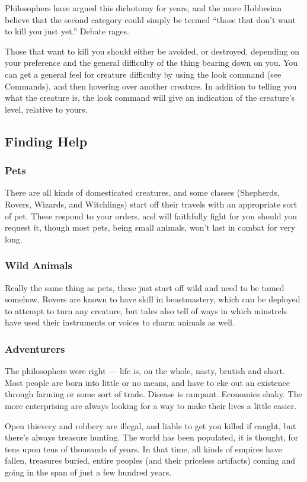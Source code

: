 Philosophers have argued this dichotomy for years, and the more Hobbesian
believe that the second category could simply be termed ``those that don't
want to kill you just yet.''  Debate rages.

Those that want to kill you should either be avoided, or destroyed,
depending on your preference and the general difficulty of the thing
bearing down on you.  You can get a general feel for creature difficulty
by using the look command (see Commands), and then hovering over another 
creature.  In addition to telling you what the creature is, the look 
command will give an indication of the creature's level, relative to yours.

\subsection{Finding Help}
\subsubsection{Pets}
There are all kinds of domesticated creatures, and some classes (Shepherds,
Rovers, Wizards, and Witchlings) start off their travels with an appropriate
sort of pet.  These respond to your orders, and will faithfully fight for
you should you request it, though most pets, being small animals, won't last
in combat for very long.

\subsubsection{Wild Animals}
Really the same thing as pets, these just start off wild and need to be
tamed somehow.  Rovers are known to have skill in beastmastery, which can be
deployed to attempt to turn any creature, but tales also tell of ways in
which minstrels have used their instruments or voices to charm animals as 
well.

\subsubsection{Adventurers}
The philosophers were right --- life is, on the whole, nasty, brutish and
short.  Most people are born into little or no means, and have to eke out an
existence through farming or some sort of trade.  Disease is rampant.
Economies shaky.  The more enterprising are always looking for a way to make
their lives a little easier.

Open thievery and robbery are illegal, and liable to get you killed if caught,
but there's always treasure hunting.  The world has been populated, it is
thought, for tens upon tens of thousands of years.  In that time, all kinds of
empires have fallen, treasures buried, entire peoples (and their priceless
artifacts) coming and going in the span of just a few hundred years.

